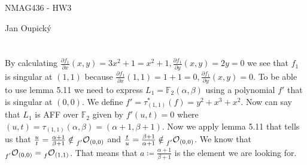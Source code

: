 \documentclass[12pt, a4paper]{article}
\begin{document}
\begin{center}
\large NMAG436 - HW3

\normalsize Jan Oupický
\end{center}
\vspace{1\baselineskip}

\section{}
By calculating $\frac{\partial f_1}{\partial x} (x,y) = 3x^2+1=x^2+1, \frac{\partial f_1}{\partial y} (x,y) = 2y=0$ we see that $f_1$ is singular at $(1,1)$ because $\frac{\partial f_1}{\partial x} (1,1)= 1+1=0, \frac{\partial f_1}{\partial y} (x,y)=0$. To be able to use lemma 5.11 we need to express $L_1=\mathbb{F}_2(\alpha,\beta)$ using a polynomial $f'$ that is singular at $(0,0)$. We define $f'=\tau_{(1,1)}^{*}(f) = y^2+x^3+x^2$. Now can say that $L_1$ is AFF over $\mathbb{F}_2$ given by $f'(u,t)=0$ where $(u,t)=\tau_{(1,1)}(\alpha,\beta) = (\alpha+1,\beta+1)$. Now we apply lemma 5.11 that tells us that $\frac{u}{t}=\frac{\alpha+1}{\beta+1} \notin \prescript{}{f'}{\mathcal{O}}_{(0,0)}$ and $\frac{t}{u}=\frac{\beta+1}{\alpha+1} \notin \prescript{}{f'}{\mathcal{O}}_{(0,0)}$. We know that $\prescript{}{f'}{\mathcal{O}}_{(0,0)} = \prescript{}{f}{\mathcal{O}}_{(1,1)}$. That means that $a \coloneqq \frac{\alpha+1}{\beta+1}$ is the element we are looking for.
\end{document}
